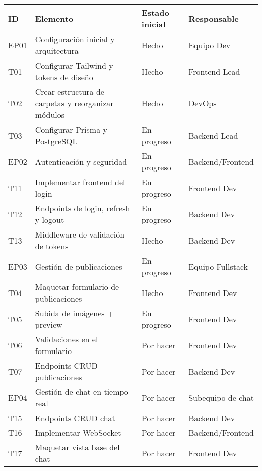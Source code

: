 \documentclass{article}
\begin{document}
\begin{longtable}{|p{}|p{}|p{}|p{}|}
\hline
\textbf{ID} & \textbf{Elemento} & \textbf{Estado inicial} & \textbf{Responsable} \\
\hline
EP01 & Configuraci\'on inicial y arquitectura               & Hecho        & Equipo Dev        \\
\hline
T01 & Configurar Tailwind y tokens de dise\~no             & Hecho        & Frontend Lead     \\
\hline
T02 & Crear estructura de carpetas y reorganizar m\'odulos & Hecho        & DevOps            \\
\hline
T03 & Configurar Prisma y PostgreSQL                     & En progreso & Backend Lead      \\
\hline
EP02 & Autenticaci\'on y seguridad                          & En progreso & Backend/Frontend  \\
\hline
T11 & Implementar frontend del login                     & En progreso & Frontend Dev      \\
\hline
T12 & Endpoints de login, refresh y logout               & En progreso & Backend Dev       \\
\hline
T13 & Middleware de validaci\'on de tokens                 & Hecho        & Backend Dev       \\
\hline
EP03 & Gesti\'on de publicaciones                           & En progreso & Equipo Fullstack    \\
\hline
T04 & Maquetar formulario de publicaciones               & Hecho        & Frontend Dev      \\
\hline
T05 & Subida de im\'agenes + preview                       & En progreso & Frontend Dev      \\
\hline
T06 & Validaciones en el formulario                      & Por hacer      & Frontend Dev      \\
\hline
T07 & Endpoints CRUD publicaciones                       & Por hacer      & Backend Dev       \\
\hline
EP04 & Gesti\'on de chat en tiempo real                     & Por hacer      & Subequipo de chat      \\
\hline
T15 & Endpoints CRUD chat                                & Por hacer      & Backend Dev       \\
\hline
T16 & Implementar WebSocket                              & Por hacer      & Backend/Frontend  \\
\hline
T17 & Maquetar vista base del chat                       & Por hacer      & Frontend Dev      \\

\end{longtable}
\end{document}
